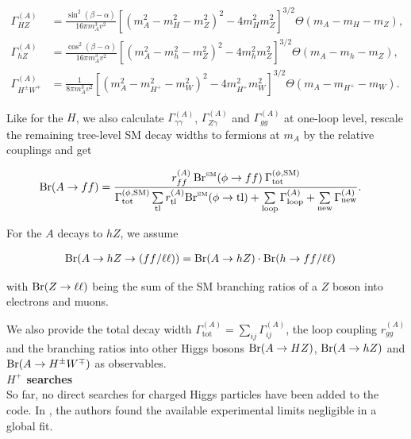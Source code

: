\documentclass[preprint,3p,12pt]{elsarticle}
\begin{document}
{\begin{align}
 \Gamma ^{(A)}_{HZ} &= \frac{\sin^2 (\beta -\alpha )}{16 \pi m_A^3 v^2} \left[ (m_A^2-m_H^2-m_Z^2)^2-4 m_H^2 m_Z^2\right] ^{3/2}  \Theta (m_A-m_H-m_Z), \nonumber \\
 \Gamma ^{(A)}_{hZ} &= \frac{\cos^2 (\beta -\alpha )}{16 \pi m_A^3 v^2} \left[ (m_A^2-m_h^2-m_Z^2)^2-4 m_h^2 m_Z^2\right] ^{3/2}  \Theta (m_A-m_h-m_Z), \nonumber \\
 \Gamma ^{(A)}_{H^\pm W^\mp } &= \frac{1}{8 \pi m_A^3 v^2} \left[ (m_A^2-m_{H^+}^2-m_W^2)^2-4 m_{H^+}^2 m_W^2\right] ^{3/2}  \Theta (m_A-m_{H^+}-m_W). \nonumber
\end{align}

Like for the $H$, we also calculate $\Gamma_{\gamma \gamma}^{(A)}$, $\Gamma_{Z \gamma}^{(A)}$ and $\Gamma_{gg}^{(A)}$ at one-loop level, rescale the remaining tree-level SM decay widths to fermions at $m_A$ by the relative couplings and get

\begin{align}
 {\rm Br}(A\to ff) &= \frac{r_{ff}^{(A)} \: {\rm Br}^{\text{\tiny{SM}}} (\phi \to ff) \: \Gamma^{(\phi ,\text{SM})}_{\text{tot}}}{\Gamma^{(\phi ,\text{SM})}_{\text{tot}} \sum\limits_{\rm tl} r_{\rm tl}^{(A)} {\rm Br}^{\text{\tiny{SM}}} (\phi \to {\rm tl}) + \sum\limits_{\rm loop} \Gamma_{\rm loop}^{(A)} + \sum\limits_{\rm new} \Gamma_{\rm new}^{(A)}} \nonumber .
\end{align}

For the $A$ decays to $hZ$, we assume

\begin{align}
 {\rm Br}(A\to hZ\to (ff / \ell \ell )) &=  {\rm Br}(A\to hZ)  \cdot {\rm Br}(h\to ff / \ell \ell )\nonumber 
\end{align}

with ${\rm Br}(Z\to \ell \ell )$ being the sum of the SM branching ratios of a $Z$ boson into electrons and muons.

We also provide the total decay width $\Gamma^{(A)}_{\text{tot}}=\sum_{ij}\Gamma_{ij}^{(A)}$, the loop coupling $r_{gg}^{(A)}$ and the branching ratios into other Higgs bosons ${\rm Br}(A\to HZ)$, ${\rm Br}(A\to hZ)$ and ${\rm Br}(A\to H^\pm W^\mp)$ as observables.\\

\textbf{$H^+$ searches}\\

So far, no direct searches for charged Higgs particles have been added to the code. In \cite{Chowdhury:2015yja}, the authors found the available experimental limits negligible in a global fit.

}
\end{document}
